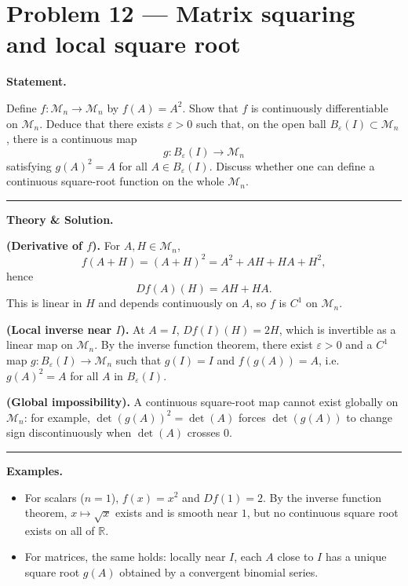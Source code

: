 \documentclass[12pt,a4paper]{article}
\theoremstyle{plain}
\theoremstyle{definition}
\theoremstyle{remark}
\theoremstyle{remark}
\newcommand{\gap}{\vspace{6pt}}
\begin{document}
\section*{Problem 12 — Matrix squaring and local square root}

\textbf{Statement.}\gap

Define $f:\mathcal{M}_n\to\mathcal{M}_n$ by $f(A)=A^2$.  
Show that $f$ is continuously differentiable on $\mathcal{M}_n$.  
Deduce that there exists $\varepsilon>0$ such that, on the open ball
$B_\varepsilon(I)\subset\mathcal{M}_n$, there is a continuous map
\[
g:B_\varepsilon(I)\longrightarrow \mathcal{M}_n
\]
satisfying $g(A)^2=A$ for all $A\in B_\varepsilon(I)$.
Discuss whether one can define a continuous square-root function on the whole $\mathcal{M}_n$.

\bigskip\hrule\bigskip

\textbf{Theory \& Solution.}\gap

\textbf{(Derivative of $f$).}\;
For $A,H\in\mathcal{M}_n$,
\[
f(A+H)=(A+H)^2=A^2+AH+HA+H^2,
\]
hence
\[
Df(A)(H)=AH+HA.
\]
This is linear in $H$ and depends continuously on $A$,
so $f$ is $C^1$ on $\mathcal{M}_n$.

\medskip

\textbf{(Local inverse near $I$).}\;
At $A=I$, $Df(I)(H)=2H$, which is invertible as a linear map on $\mathcal{M}_n$.  
By the inverse function theorem, there exist $\varepsilon>0$
and a $C^1$ map $g:B_\varepsilon(I)\to\mathcal{M}_n$ such that
$g(I)=I$ and $f(g(A))=A$, i.e.\ $g(A)^2=A$ for all $A$ in $B_\varepsilon(I)$.

\medskip

\textbf{(Global impossibility).}\;
A continuous square-root map cannot exist globally on $\mathcal{M}_n$:
for example, $\det(g(A))^2=\det(A)$ forces $\det(g(A))$ to change sign
discontinuously when $\det(A)$ crosses $0$.

\bigskip\hrule\bigskip

\textbf{Examples.}\gap
\begin{itemize}\setlength{\itemsep}{6pt}
	\item For scalars ($n=1$), $f(x)=x^2$ and $Df(1)=2$.
	By the inverse function theorem, $x\mapsto\sqrt{x}$ exists and is smooth near $1$,
	but no continuous square root exists on all of $\mathbb{R}$.
	\item For matrices, the same holds: locally near $I$, each $A$ close to $I$ has a
	unique square root $g(A)$ obtained by a convergent binomial series.
\end{itemize}
\end{document}
